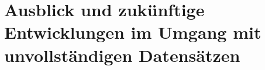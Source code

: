 \chapter{Ausblick und zukünftige Entwicklungen im Umgang mit unvollständigen Datensätzen}\label{sec:outlook}